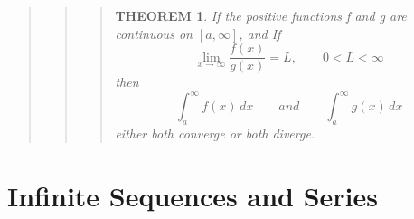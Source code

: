 \documentclass{report}
\newtheorem{theorem}{THEOREM}
\begin{document}
\begin{quote}
\begin{quote}
\begin{quote}
			\begin{theorem}
				If the positive functions f and g are continuous on $\left [a,\infty \right ]$, and If
				$$\lim_{x\to \infty}\frac{f(x)}{g(x)} = L, \qquad 0<L<\infty$$
				then
				$$\int_{a}^{\infty}f(x)\,dx\qquad and\qquad \int_{a}^{\infty}g(x)\,dx$$
				either both converge or both diverge.
			\end{theorem}

		\end{quote}
	\end{quote}

\end{quote}


\setcounter{chapter}{9}
\setcounter{theorem}{1}
\chapter{Infinite Sequences and Series }

\end{document}
